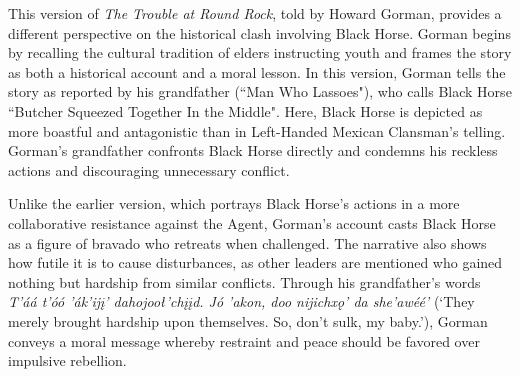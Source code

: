This version of \textit{The Trouble at Round Rock}, told by Howard Gorman, provides a different perspective on the historical clash involving Black Horse. Gorman begins by recalling the cultural tradition of elders instructing youth and frames the story as both a historical account and a moral lesson. In this version, Gorman tells the story as reported by his grandfather (``Man Who Lassoes"), who calls Black Horse ``Butcher Squeezed Together In the Middle". Here, Black Horse is depicted as more boastful and antagonistic than in Left-Handed Mexican Clansman's telling. Gorman's grandfather confronts Black Horse directly and condemns his reckless actions and discouraging unnecessary conflict.

Unlike the earlier version, which portrays Black Horse's actions in a more collaborative resistance against the Agent, Gorman's account casts Black Horse as a figure of bravado who retreats when challenged. The narrative also shows how futile it is to cause disturbances, as other leaders are mentioned who gained nothing but hardship from similar conflicts. Through his grandfather's words \textit{T’áá t’óó ’ák’ijį’ dahojooł’chįįd. Jó ’akon, doo nijichxǫ’ da she’awéé’} (`They merely brought hardship upon themselves. So, don't sulk, my baby.'), Gorman conveys a moral message whereby restraint and peace should be favored over impulsive rebellion.
